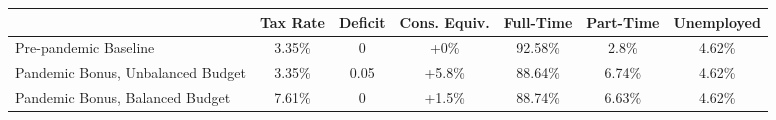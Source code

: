 \begin{center}
\begin{adjustbox}{width=\textwidth}
\begin{tabular}{lcccccc}\toprule
 & Tax Rate & Deficit & Cons. Equiv. & Full-Time & Part-Time & Unemployed \\
\midrule
Pre-pandemic Baseline & 3.35\% & 0 & +0\% & 92.58\% & 2.8\% & 4.62\% \\
Pandemic Bonus, Unbalanced Budget & 3.35\% & 0.05 & +5.8\% & 88.64\% & 6.74\% & 4.62\% \\
Pandemic Bonus, Balanced Budget & 7.61\% & 0 & +1.5\% & 88.74\% & 6.63\% & 4.62\% \\
\bottomrule\end{tabular}
\end{adjustbox}
\end{center}